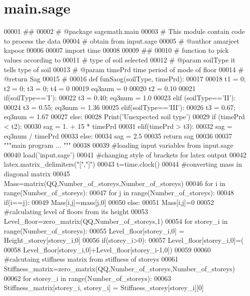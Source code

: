\hypertarget{main_8sage_source}{}\section{main.\+sage}
\label{main_8sage_source}

\begin{DoxyCode}
00001 ##
00002 # @package sagemath.main
00003 # This module contain code to process the data
00004 # obtain from input.sage
00005 # @author amarjeet kapoor
00006 
00007 import time
00008 
00009 ##
00010 #  function to pick values according to
00011 #  type of soil selected
00012 # @param soilType it tells type of soil
00013 # @param timePrd time period of mode of floor 
00014 # @return Sag 
00015 #
00016 def funSaog(soilType, timePrd):
00017 
00018   t1 = 0; t2 = 0; t3 = 0; t4 = 0
00019   eq3num = 0
00020   t2 = 0.10
00021   if(soilType=='I'):
00022       t3 = 0.40; eq3num = 1.0
00023   elif (soilType=='II'):
00024       t3 = 0.55; eq3num = 1.36
00025   elif(soilType=='III'):
00026       t3 = 0.67; eq3num = 1.67
00027   else:
00028       Print('Unexpected soil type')
00029   if (timePrd < t2):
00030       sag = 1. + 15 * timePrd
00031   elif(timePrd > t3):
00032       sag = eq3num / timePrd
00033   else:
00034       sag = 2.5
00035   return sag
00036 
00037 """main program ... """
00038 
00039 #loading input variables from input.sage
00040 load('input.sage')
00041 #changing style of brackets for latex output
00042 latex.matrix\_delimiters("[","]")
00043 t=time.clock()
00044 #converting mass in diagonal matrix
00045 Mass=matrix(QQ,Number\_of\_storeys,Number\_of\_storeys)
00046 for i in range(Number\_of\_storeys):
00047     for j in range(Number\_of\_storeys):
00048         if(i==j):
00049             Mass[i,j]=mass[j,0]
00050         else:
00051             Mass[i,j]=0
00052 #calculating level of floors from its height
00053 Level\_floor=zero\_matrix(QQ,Number\_of\_storeys,1)
00054 for storey\_i in range(Number\_of\_storeys):
00055     Level\_floor[storey\_i,0] = Height\_storey[storey\_i,0]
00056     if(storey\_i>0):
00057         Level\_floor[storey\_i,0]=(
00058         Level\_floor[storey\_i,0]+Level\_floor[storey\_i-1,0])
00059 
00060 #calcutaing stiffness matrix from stiffness of storeys
00061 Stiffness\_matrix=zero\_matrix(QQ,Number\_of\_storeys,Number\_of\_storeys)
00062 for storey\_i in range(Number\_of\_storeys):
00063    Stiffness\_matrix[storey\_i, storey\_i] = Stiffness\_storey[storey\_i][0]

\end{DoxyCode}
